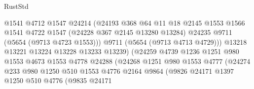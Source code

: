 \begin{lexlean}{RustStd}
\begin{coremodule}
                                    @1541
                                    @4712
                                    @1547
                                    @24214
                                    (@24193
                                      @368
                                      @64
                                      @11
                                      @18
                                      @2145
                                      @1553
                                      @1566
                                      @1541
                                      @4722
                                      @1547
                                      (@24228 @367 @2145 @13280 @13284)
                                      @24235
                                      @9711
                                      (@5654 (@9713 @4723 @1553)))
                                    @9711
                                    (@5654 (@9713 @4713 @4729)))
                                  @13218
                                  @13221
                                  @13224
                                  @13228
                                  @13233
                                  @13239)
                                (@24259
                                  @4739
                                  @1236
                                  @1251
                                  @980
                                  @1553
                                  @4673
                                  @1553
                                  @4778
                                  @24288
                                  (@24268
                                    @1251
                                    @980
                                    @1553
                                    @4777
                                    (@24274
                                      @233
                                      @980
                                      @1250
                                      @510
                                      @1553
                                      @4776
                                      @2164
                                      @9864
                                      (@9826
                                        @24171
                                        @1397
                                        @1250
                                        @510
                                        @4776
                                        (@9835
                                          @24171

\end{coremodule}
\end{lexlean}
